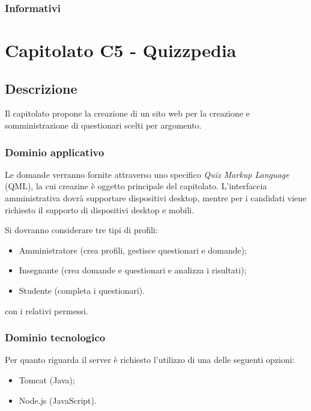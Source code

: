 \documentclass[12pt,a4paper]{article}
\begin{document}
\subsubsection{Informativi}

\newpage
\section{Capitolato C5 - Quizzpedia}
\subsection{Descrizione}

Il capitolato propone la creazione di un sito web per la creazione e somministrazione di questionari scelti
per argomento.

\subsubsection{Dominio applicativo}

Le domande verranno fornite attraverso uno specifico \textit{Quiz Markup Language} (QML), la cui creazine
è oggetto principale del capitolato.
L'interfaccia amministrativa dovrà supportare dispositivi desktop, mentre per i candidati viene richiesto 
il supporto di dispositivi desktop e mobili.

Si dovranno considerare tre tipi di profili:

\begin{itemize}
\item Amministratore (crea profili, gestisce questionari e domande);
\item Insegnante (crea domande e questionari e analizza i risultati);
\item Studente (completa i questionari).
\end{itemize}

con i relativi permessi.

\subsubsection{Dominio tecnologico}

Per quanto riguarda il server è richiesto l'utilizzo di una delle seguenti opzioni:

\begin{itemize}
\item Tomcat (Java);
\item Node.js (JavaScript).
\end{itemize}
\end{document}
